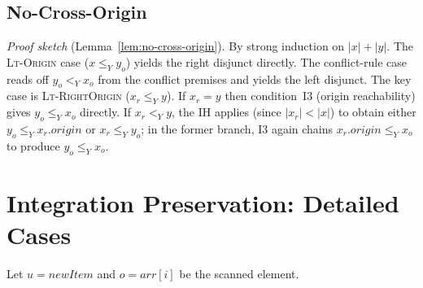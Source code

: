 \documentclass[sigplan,screen]{acmart}
\newcommand{\YjsLt}{\mathrel{<_Y}}
\newcommand{\YjsLeq}{\mathrel{\leq_Y}}
\begin{document}
\subsection{No-Cross-Origin}

\noindent\textit{Proof sketch} (Lemma~\ref{lem:no-cross-origin}).
By strong induction on $|x| + |y|$.
The \textsc{Lt-Origin} case ($x \YjsLeq y_o$) yields
the right disjunct directly.
The conflict-rule case reads off
$y_o \YjsLt x_o$ from the conflict premises and
yields the left disjunct.
The key case is \textsc{Lt-RightOrigin}
($x_r \YjsLeq y$).  If $x_r = y$ then condition~I3
(origin reachability) gives $y_o \YjsLeq x_o$
directly.  If $x_r \YjsLt y$, the IH applies
(since $|x_r| < |x|$) to obtain either
$y_o \YjsLeq x_r.\mathit{origin}$ or
$x_r \YjsLeq y_o$; in the former branch, I3 again
chains $x_r.\mathit{origin} \YjsLeq x_o$ to produce
$y_o \YjsLeq x_o$.

\section{Integration Preservation: Detailed Cases}
\label{app:preservation-cases}

Let $u = \mathit{newItem}$ and $o = \mathit{arr}[i]$ be the scanned element.
\end{document}
